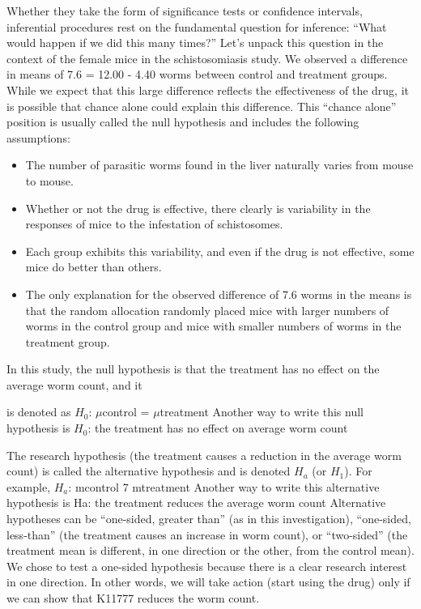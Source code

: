 \documentclass[
]{report}
\providecommand{\tightlist}{%
  \setlength{\itemsep}{0pt}\setlength{\parskip}{0pt}}
\theoremstyle{definition}
\theoremstyle{definition}
\theoremstyle{definition}
\theoremstyle{definition}
\theoremstyle{remark}
\begin{document}
Whether they take the form of significance tests or confidence intervals, inferential procedures rest on the fundamental question for inference: ``What would happen if we did this many times?'' Let's unpack this
question in the context of the female mice in the schistosomiasis study. We observed a difference in means
of 7.6 = 12.00 - 4.40 worms between control and treatment groups. While we expect that this large difference
reflects the effectiveness of the drug, it is possible that chance alone could explain this difference. This
``chance alone'' position is usually called the null hypothesis and includes the following assumptions:

\begin{itemize}
\tightlist
\item
  The number of parasitic worms found in the liver naturally varies from mouse to mouse.
\item
  Whether or not the drug is effective, there clearly is variability in the responses of mice to the infestation
  of schistosomes.
\item
  Each group exhibits this variability, and even if the drug is not effective, some mice do better than
  others.
\item
  The only explanation for the observed difference of 7.6 worms in the means is that the random
  allocation randomly placed mice with larger numbers of worms in the control group and mice with
  smaller numbers of worms in the treatment group.
\end{itemize}

In this study, the null hypothesis is that the treatment has no effect on the average worm count, and it

is denoted as
\textbar{} \(H_0\): \(\mu\)control = \(\mu\)treatment
Another way to write this null hypothesis is
\(H_0\): the treatment has no effect on average worm count

The research hypothesis (the treatment causes a reduction in the average worm count) is called the alternative
hypothesis and is denoted \(H_a\) (or \(H_1\)). For example,
\(H_a\): mcontrol 7 mtreatment
Another way to write this alternative hypothesis is
Ha: the treatment reduces the average worm count
Alternative hypotheses can be ``one-sided, greater than'' (as in this investigation), ``one-sided, less-than''
(the treatment causes an increase in worm count), or ``two-sided'' (the treatment mean is different, in one
direction or the other, from the control mean). We chose to test a one-sided hypothesis because there is a
clear research interest in one direction. In other words, we will take action (start using the drug) only if we
can show that K11777 reduces the worm count.
\end{document}
